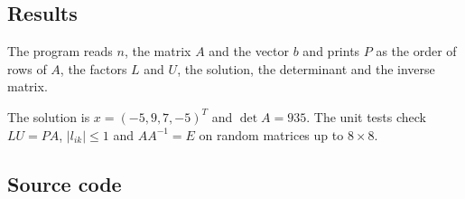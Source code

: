 \subsection{Results}

The program reads $n$, the matrix $A$ and the vector $b$ and prints $P$ as the order of rows of
$A$, the factors $L$ and $U$, the solution, the determinant and the inverse matrix.




The solution is $x = (-5, 9, 7, -5)^T$ and $\det A = 935$. The unit tests check $LU = PA$,
$|l_{ik}| \le 1$ and $AA^{-1} = E$ on random matrices up to $8 \times 8$.

\subsection{Source code}




\pagebreak

